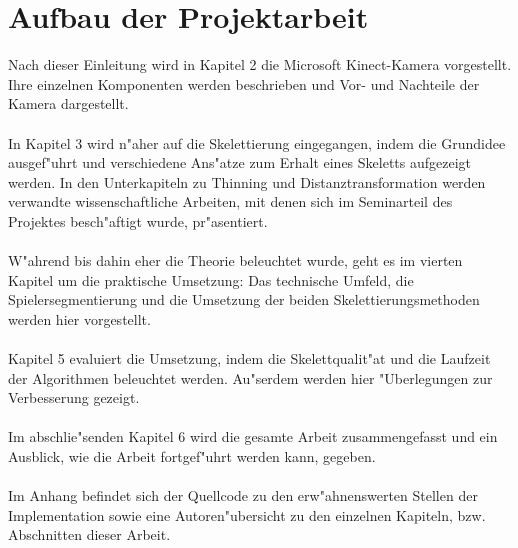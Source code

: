 \section{Aufbau der Projektarbeit}
Nach dieser Einleitung wird in Kapitel 2 die Microsoft Kinect-Kamera vorgestellt. Ihre einzelnen Komponenten werden beschrieben und Vor- und Nachteile der Kamera dargestellt. \\  \\ In Kapitel 3 wird n"aher auf die Skelettierung eingegangen, indem die Grundidee ausgef"uhrt und verschiedene Ans"atze zum Erhalt eines Skeletts aufgezeigt werden. In den Unterkapiteln zu Thinning und Distanztransformation werden verwandte wissenschaftliche Arbeiten, mit denen sich im Seminarteil des Projektes besch"aftigt wurde, pr"asentiert. \\ \\ W"ahrend bis dahin eher die Theorie beleuchtet wurde, geht es im vierten Kapitel um die praktische Umsetzung: Das technische Umfeld, die Spielersegmentierung und die Umsetzung der beiden Skelettierungsmethoden werden hier vorgestellt. \\ \\ Kapitel 5 evaluiert die Umsetzung, indem die Skelettqualit"at und die Laufzeit der Algorithmen beleuchtet werden. Au"serdem werden hier "Uberlegungen zur Verbesserung gezeigt. \\ \\ Im abschlie"senden Kapitel 6 wird die gesamte Arbeit zusammengefasst und ein Ausblick, wie die Arbeit fortgef"uhrt werden kann, gegeben. \\ \\ Im Anhang befindet sich der Quellcode zu den erw"ahnenswerten Stellen der Implementation sowie eine Autoren"ubersicht zu den einzelnen Kapiteln, bzw. Abschnitten dieser Arbeit.
